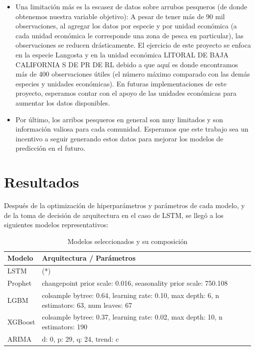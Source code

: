 \documentclass[twoside,11pt]{article}
\begin{document}
\begin{enumerate}
\begin{itemize}
        \item Una limitación más es la escasez de datos sobre arrubos pesqueros (de donde obtenemos nuestra variable objetivo): A pesar de tener más de 90 mil observaciones, al agregar los datos por especie y por unidad económica (a cada unidad económica le corresponde una zona de pesca en particular), las observaciones se reducen drásticamente. El ejercicio de este proyecto se enfoca en la especie Langosta y en la unidad económica  LITORAL DE BAJA CALIFORNIA S DE PR DE RL debido a que aquí es donde encontramos más de 400 observaciones útiles (el número máximo comparado con las demás especies y unidades económicas). En futuras implementaciones de este proyecto, esperamos contar con el apoyo de las unidades económicas para aumentar los datos disponibles.
        
        \item Por último, los arribos pesqueros en general son muy limitados y son información valiosa para cada comunidad. Esperamos que este trabajo sea un incentivo a seguir generando estos datos para mejorar los modelos de predicción en el futuro.
    \end{itemize}
\end{enumerate}
\newpage
\section{Resultados}

Después de la optimización de hiperparámetros y parámetros de cada modelo, y de la toma de decisión de arquitectura en el caso de LSTM, se llegó a los siguientes modelos representativos:
\begin{table}[htbp]
\centering
\small
\begin{tabular}{lp{9.5cm}}
\toprule
Modelo & Arquitectura / Parámetros\\
\midrule
LSTM & (*) \\
Prophet & changepoint prior scale: 0.016, seasonality prior scale: 750.108 \\
LGBM & colsample bytree: 0.64, learning rate: 0.10, max depth: 6, n estimators: 63, num leaves: 67 \\
XGBoost & colsample bytree: 0.37, learning rate: 0.02,  max depth: 10, n estimators: 190 \\
ARIMA & d: 0, p: 29, q: 24, trend: c \\
\bottomrule
\end{tabular}
\caption{Modelos seleccionados y su composición}
\label{tab:modelos_seleccionados}
\end{table}
\end{document}

